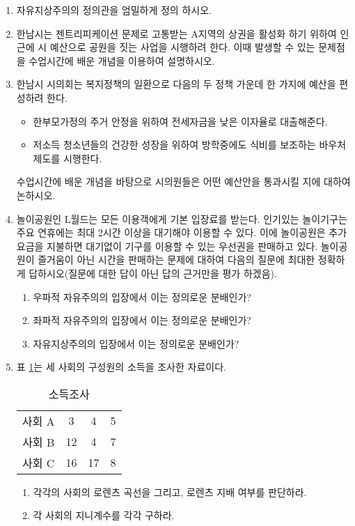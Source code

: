 \documentclass{article}
\begin{document}
\begin{enumerate}[{\bf 문제 \arabic*.}]
    \item 자유지상주의의 정의관을 엄밀하게 정의 하시오.
    
    \item 한남시는 젠트리피케이션 문제로 고통받는 A지역의 상권을 활성화 하기 위하여 인근에 시 예산으로 공원을 짓는 사업을 시행하려 한다. 이때 발생할 수 있는 문제점을 수업시간에 배운 개념을 이용하여 설명하시오.
    
    \item 한남시 시의회는 복지정책의 일환으로 다음의 두 정책 가운데 한 가지에 예산을 편성하려 한다. 
        \begin{itemize}
            \item 한부모가정의 주거 안정을 위하여 전세자금을 낮은 이자율로 대출해준다.
            \item 저소득 청소년들의 건강한 성장을 위하여 방학중에도 식비를 보조하는 바우처 제도를 시행한다. 
        \end{itemize}
        수업시간에 배운 개념을 바탕으로 시의원들은 어떤 예산안을 통과시킬 지에 대하여 논하시오.

    \item 놀이공원인 L월드는 모든 이용객에게 기본 입장료를 받는다. 인기있는 놀이기구는 주요 연휴에는 최대 2시간 이상을 대기해야 이용할 수 있다. 이에 놀이공원은 추가요금을 지불하면 대기없이 기구를 이용할 수 있는 우선권을 판매하고 있다. 놀이공원이 즐거움이 아닌 시간을 판매하는 문제에 대하여 다음의 질문에 최대한 정확하게 답하시오(질문에 대한 답이 아닌 답의 근거만을 평가 하겠음).
        \begin{enumerate}
            \item 우파적 자유주의의 입장에서 이는 정의로운 분배인가?
            \item 좌파적 자유주의의 입장에서 이는 정의로운 분배인가?
            \item 자유지상주의의 입장에서 이는 정의로운 분배인가?
        \end{enumerate}
    

\pagebreak

    \item 표 \ref{tab:incomed}는 세 사회의 구성원의 소득을 조사한 자료이다.
        \begin{table}[htbp]
            \centering
            \begin{tabular}{c|c|c|c}
                \toprule
                   사회 A & 3 & 4 & 5 \\
                   사회 B & 12 & 4 & 7 \\
                   사회 C & 16 & 17 & 8 \\
                \bottomrule
            \end{tabular}
            \caption{소득조사}
            \label{tab:incomed}
        \end{table}
        \begin{enumerate}
            \item 각각의 사회의 로렌츠 곡선을 그리고, 로렌츠 지배 여부를 판단하라.
            \item 각 사회의 지니계수를 각각 구하라.
        \end{enumerate}
        

\end{enumerate}
\end{document}
